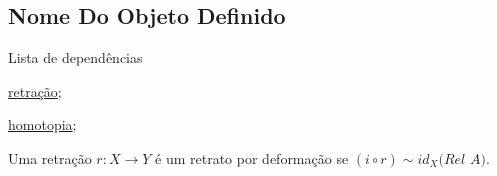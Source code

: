 \subsection{Nome Do Objeto Definido}
\label{retrato-por-deformação-def}
\begin{titlemize}{Lista de dependências}
	\item \hyperref[retração-def]{retração};\\ %
	\item \hyperref[homotopia]{homotopia};\\
\end{titlemize}
\begin{defi}
	Uma retração $r:X \rightarrow Y$ é um retrato por deformação se $(i\circ r) \sim id_X \textit{(Rel A)}$.
\end{defi}
